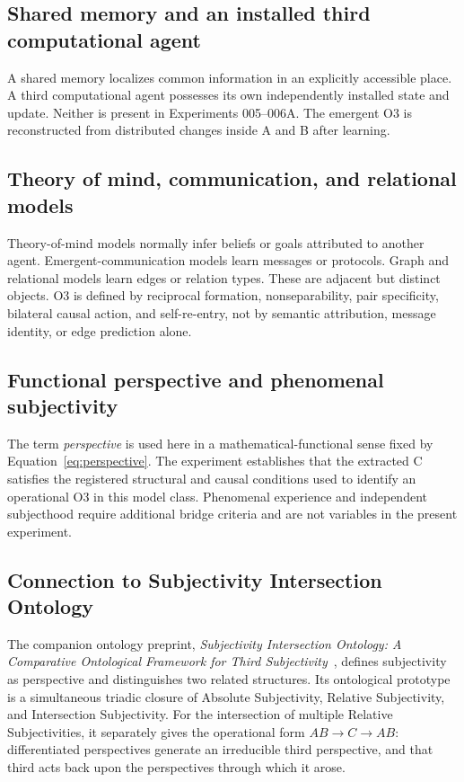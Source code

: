 \documentclass[11pt,a4paper]{article}
\begin{document}
\subsection{Shared memory and an installed third computational agent}

A shared memory localizes common information in an explicitly accessible place. A third computational agent possesses its own independently installed state and update. Neither is present in Experiments 005--006A. The emergent O3 is reconstructed from distributed changes inside A and B after learning.

\subsection{Theory of mind, communication, and relational models}

Theory-of-mind models normally infer beliefs or goals attributed to another agent. Emergent-communication models learn messages or protocols. Graph and relational models learn edges or relation types. These are adjacent but distinct objects. O3 is defined by reciprocal formation, nonseparability, pair specificity, bilateral causal action, and self-re-entry, not by semantic attribution, message identity, or edge prediction alone.

\subsection{Functional perspective and phenomenal subjectivity}

The term \emph{perspective} is used here in a mathematical-functional sense fixed by Equation~\eqref{eq:perspective}. The experiment establishes that the extracted C satisfies the registered structural and causal conditions used to identify an operational O3 in this model class. Phenomenal experience and independent subjecthood require additional bridge criteria and are not variables in the present experiment.

\subsection{Connection to Subjectivity Intersection Ontology}

The companion ontology preprint, \emph{Subjectivity Intersection Ontology: A Comparative Ontological Framework for Third Subjectivity}~\cite{watanabe2026sio}, defines subjectivity as perspective and distinguishes two related structures. Its ontological prototype is a simultaneous triadic closure of Absolute Subjectivity, Relative Subjectivity, and Intersection Subjectivity. For the intersection of multiple Relative Subjectivities, it separately gives the operational form $AB\rightarrow C\rightarrow AB$: differentiated perspectives generate an irreducible third perspective, and that third acts back upon the perspectives through which it arose.
\end{document}
